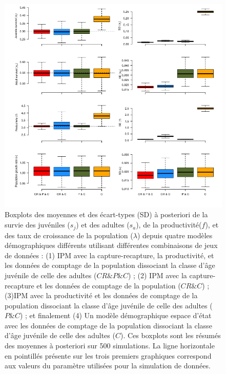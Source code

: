 \documentclass[12pt,a4paper]{article}
\begin{document}
\begin{figure}[!t]
\includegraphics[width=17cm]{500sim_CountsJAD_28062022.png}
\caption{Boxplots des moyennes et des écart-types (SD) à posteriori de la survie des juvéniles ($s_j$) et des adultes ($s_a$), de la productivité($f$), et des taux de croissance de la population ($\lambda$) depuis quatre modèles démographiques différents utilisant différentes combinaisons de jeux de données : (1) IPM avec la capture-recapture, la productivité, et les données de comptage de la population dissociant la classe d'âge juvénile de celle des adultes ($CR \& P \& C$) ; (2) IPM avec la capture-recapture et les données de comptage de la population ($CR \& C$) ; (3)IPM avec la productivité et les données de comptage de la population dissociant la classe d'âge juvénile de celle des adultes ($P \& C$) ; et finalement (4) Un modèle démographique espace d'état avec les données de comptage de la population dissociant la classe d'âge juvénile de celle des adultes ($C$). Ces boxplots sont les résumés des moyennes à posteriori sur 500 simulations. La ligne horizontale en pointillés présente sur les trois premiers graphiques correspond aux valeurs du paramètre utilisées pour la simulation de données.}
\end{figure}
\end{document}
